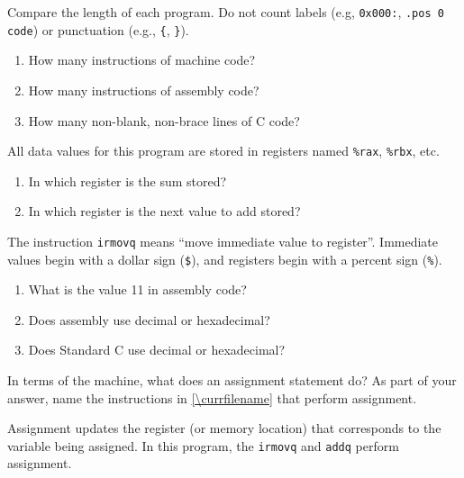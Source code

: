 

\Q Compare the length of each program. Do not count labels (e.g, \verb|0x000:|, \verb|.pos 0 code|) or punctuation (e.g., \verb|{|, \verb|}|).

\begin{enumerate}
\item How many instructions of machine code?          
\item How many instructions of assembly code?         
\item How many non-blank, non-brace lines of C code?  
\end{enumerate}


\Q All data values for this program are stored in registers named \verb|%rax|, \verb|%rbx|, etc.

\begin{enumerate}
\item In which register is the sum stored?                
\item In which register is the next value to add stored?  
\end{enumerate}


\Q The instruction \verb|irmovq| means ``move immediate value to register''. Immediate values begin with a dollar sign (\verb|$|), and registers begin with a percent sign (\verb|%|).

\begin{enumerate}
\item What is the value 11 in assembly code?       
\item Does assembly use decimal or hexadecimal?    
\item Does Standard C use decimal or hexadecimal?  
\end{enumerate}


\Q In terms of the machine, what does an assignment statement do?
As part of your answer, name the instructions in \ref{\currfilename} that perform assignment.

\begin{answer}
Assignment updates the register (or memory location) that corresponds to the variable being assigned.
In this program, the \verb|irmovq| and \verb|addq| perform assignment.
\end{answer}


